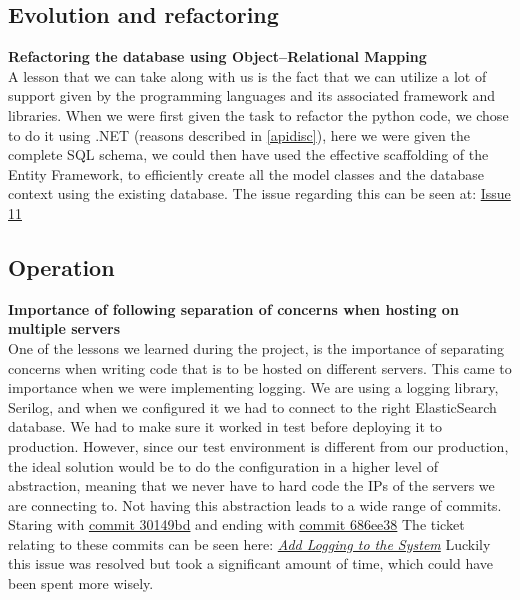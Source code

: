 \documentclass[10pt]{article}
\begin{document}
\subsection{Evolution and refactoring}

\textbf{Refactoring the database using Object–Relational Mapping}\\
A lesson that we can take along with us is the fact that we can utilize a lot of support given by the programming languages and its associated framework and libraries. When we were first given the task to refactor the python code, we chose to do it using .NET (reasons described in \ref{apidisc}), here we were given the complete SQL schema, we could then have used the effective scaffolding of the Entity Framework, to efficiently create all the model classes and the database context using the existing database. The issue regarding this can be seen at: \href{https://github.com/Arklaide/devopsITUproject/issues/11}{Issue 11}
\subsection{Operation}

\textbf{Importance of following separation of concerns when hosting on multiple servers}\\
One of the lessons we learned during the project, is the importance of separating concerns when writing code that is to be hosted on different servers. This came to importance when we were implementing logging.
We are using a logging library, Serilog, and when we configured it we had to connect to the right ElasticSearch database. We had to make sure it worked in test before deploying it to production. However, since our test environment is different from our production, the ideal solution would be to do the configuration in a higher level of abstraction, meaning that we never have to hard code the IPs of the servers we are connecting to. Not having this abstraction leads to a wide range of commits. Staring with \href{https://github.com/Arklaide/devopsITUproject/commit/30149bd9f5b1696ac1e10e3e6806d8db11e16c26}{commit 30149bd} and ending with \href{https://github.com/Arklaide/devopsITUproject/commit/686ee3893fabcce450d1844bf1743780d690413a}{commit 686ee38}
The ticket relating to these commits can be seen here: \href{https://github.com/Arklaide/devopsITUproject/issues/61}{\textit{Add Logging to the System}}
Luckily this issue was resolved but took a significant amount of time, which could have been spent more wisely.
\end{document}
